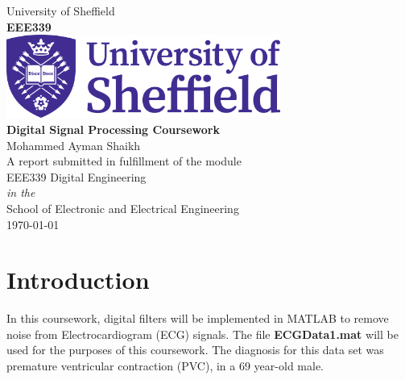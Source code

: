 \documentclass[11pt,oneside]{book}
\begin{document}
\setcounter{tocdepth}{0} 
\renewcommand\labelitemi{---}

\frontmatter

\begin{titlepage}
\begin{center}
{\LARGE University of Sheffield}\\[1.5cm]
\linespread{1.2}\Large {\bfseries EEE339}\\[2cm]
\linespread{1}
\includegraphics[width=9cm]{images/logo.png}\\[1.5cm]

\linespread{1.2}\Large {\bfseries Digital Signal Processing Coursework}\\[1cm]
{\Large Mohammed Ayman Shaikh}\\[1cm]
\large A report submitted in fulfillment of the module\\EEE339 Digital Engineering\\[0.3cm] 
\textit{in the}\\[0.3cm]
School of Electronic and Electrical Engineering\\[2cm]
\today
\end{center}

\end{titlepage}


\linespread{1.5}





\chapter{Introduction}
In this coursework, digital filters will be implemented in MATLAB to remove noise from 
Electrocardiogram (ECG) signals. The file \textbf{ECGData1.mat} will be used for the purposes of this coursework. The diagnosis for this data set was premature ventricular contraction (PVC), in a 69 year-old male.
\end{document}

